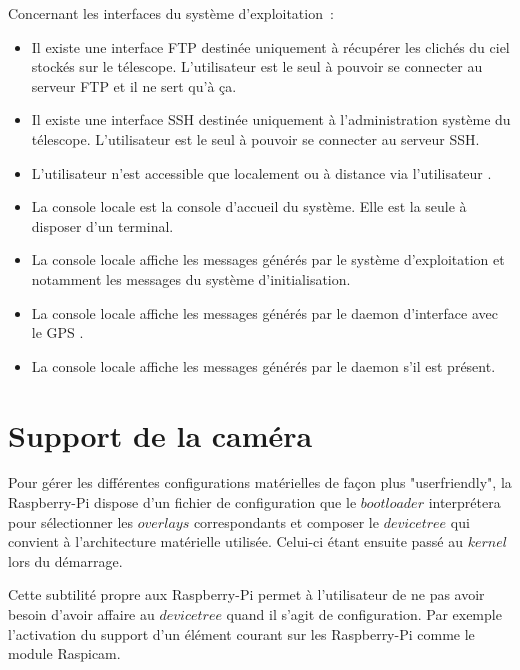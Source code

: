 \vspace{1cm}

Concernant les interfaces du système d'exploitation~:
\begin{itemize}[label=$\bullet$]
	\item Il existe une interface FTP destinée uniquement à récupérer les clichés du ciel stockés sur le télescope. L'utilisateur  est le seul à pouvoir se connecter au serveur FTP et il ne sert qu'à ça.
	\item Il existe une interface SSH destinée uniquement à l'administration système du télescope. L'utilisateur  est le seul à pouvoir se connecter au serveur SSH.
	\item L'utilisateur  n'est accessible que localement ou à distance via l'utilisateur .
	\item La console locale  est la console d'accueil du système. Elle est la seule à disposer d'un terminal.
	\item La console locale  affiche les messages générés par le système d'exploitation et notamment les messages du système d'initialisation.
	\item La console locale  affiche les messages générés par le daemon d'interface avec le GPS .
	\item La console locale  affiche les messages générés par le daemon  s'il est présent.
	\end{itemize}

\section{Support de la caméra}

Pour gérer les différentes configurations matérielles de façon plus "userfriendly", la\\Raspberry-Pi dispose d'un fichier de configuration  que le $bootloader$ interprétera pour sélectionner les $overlays$ correspondants et composer le $devicetree$ qui convient à l'architecture matérielle utilisée. Celui-ci étant ensuite passé au $kernel$ lors du démarrage.


Cette subtilité propre aux Raspberry-Pi permet à l'utilisateur de ne pas avoir besoin d'avoir affaire au $devicetree$ quand il s'agit de configuration. Par exemple l'activation du support d'un élément courant sur les Raspberry-Pi comme le module Raspicam.

